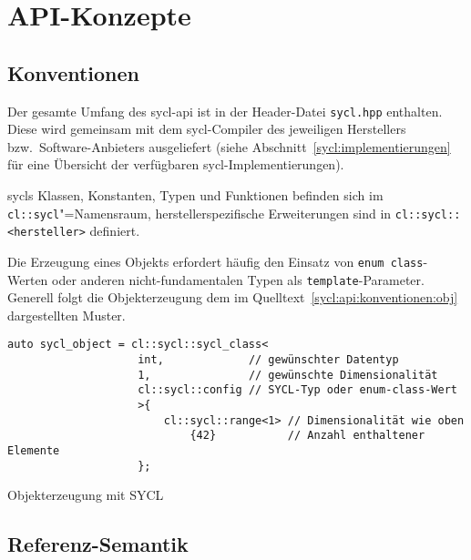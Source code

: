 \section{API-Konzepte}\label{sycl:api}

\subsection{Konventionen}\label{sycl:api:konventionen}

Der gesamte Umfang des \gls{sycl}-\gls{api} ist in der Header-Datei
\texttt{sycl.hpp} enthalten. Diese wird gemeinsam mit dem \gls{sycl}-Compiler
des jeweiligen Herstellers bzw.\ Software-Anbieters ausgeliefert (siehe
Abschnitt~\ref{sycl:implementierungen} für eine Übersicht der verfügbaren
\gls{sycl}-Implementierungen). \cite[vgl.][Abschnitt 4.1]{sycl2019}

\gls{sycl}s Klassen, Konstanten, Typen und Funktionen befinden sich im
\texttt{cl::sycl}"=Namensraum, herstellerspezifische Erweiterungen sind in
\texttt{cl::sycl::<hersteller>} definiert. \cite[vgl.][Abschnitt 4.1]{sycl2019}

Die Erzeugung eines Objekts erfordert häufig den Einsatz von
\texttt{enum class}-Werten oder anderen nicht-fundamentalen Typen als
\texttt{template}-Parameter. Generell folgt die Objekterzeugung dem im
Quelltext~\ref{sycl:api:konventionen:obj} dargestellten Muster.

\begin{code}
    \begin{verbatim}
auto sycl_object = cl::sycl::sycl_class<
                    int,             // gewünschter Datentyp
                    1,               // gewünschte Dimensionalität
                    cl::sycl::config // SYCL-Typ oder enum-class-Wert
                    >{
                        cl::sycl::range<1> // Dimensionalität wie oben
                            {42}           // Anzahl enthaltener Elemente
                    };
    \end{verbatim}
    \caption{Objekterzeugung mit SYCL}
    \label{sycl:api:konventionen:obj}
\end{code}

\subsection{Referenz-Semantik}\label{sycl:api:referenz}


